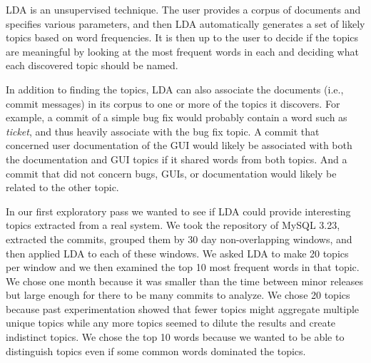 \documentclass[times, 10pt,twocolumn]{article}
\newcommand{\shrinkit}{\vspace*{-.3em}}
\begin{document}
LDA is an unsupervised technique.  The user provides a corpus of
documents and specifies various parameters, and then LDA automatically
generates a set of likely topics based on word frequencies.  It is
then up to the user to decide if the topics are meaningful by looking
at the most frequent words in each and deciding what each discovered
topic should be named.

In addition to finding the topics, LDA can also associate the
documents (i.e., commit messages) in its corpus to one or more of the
topics it discovers.  For example, a commit of a simple bug fix would
probably contain a word such as \emph{ticket}, and thus heavily associate
with the bug fix topic.  A commit that concerned user documentation of
the GUI would likely be associated with both the documentation and GUI
topics if it shared words from both topics.  And a commit that did not
concern bugs, GUIs, or documentation would likely be related to the other topic.









\shrinkit
{}
\shrinkit

In our first exploratory pass we wanted to see if LDA could provide
interesting topics extracted from a real system. We took the
repository of MySQL 3.23, extracted the commits, grouped them by 30
day non-overlapping windows, and then applied LDA to each of these
windows. We asked LDA to make 20 topics per window and we then
examined the top 10 most frequent words in that topic.  We chose one
month because it was smaller than the time between minor releases but
large enough for there to be many commits to analyze. We chose 20
topics because past experimentation showed that fewer topics might
aggregate multiple unique topics while any more topics seemed to dilute
the results and create indistinct topics. 
We chose the top 10 words because we wanted to be able to distinguish
topics even if some common words dominated the topics.



\end{document}
